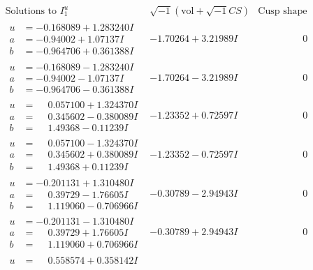 \documentclass[1p]{elsarticle_modified}
\theoremstyle{definition}
\newcommand{\I}{\sqrt{-1}}
\begin{document}
$$\begin{array}{c|c|c}
\text{Solutions to }I^u_{1}& \I (\text{vol} + \sqrt{-1}CS) & \text{Cusp shape}\\
 \hline 
\begin{aligned}
u &= -0.168089 + 1.283240 I \\
a &= -0.94002 + 1.07137 I \\
b &= -0.964706 + 0.361388 I\end{aligned}
 & -1.70264 + 3.21989 I & \phantom{-0.000000 } 0 \\ \hline\begin{aligned}
u &= -0.168089 - 1.283240 I \\
a &= -0.94002 - 1.07137 I \\
b &= -0.964706 - 0.361388 I\end{aligned}
 & -1.70264 - 3.21989 I & \phantom{-0.000000 } 0 \\ \hline\begin{aligned}
u &= \phantom{-}0.057100 + 1.324370 I \\
a &= \phantom{-}0.345602 - 0.380089 I \\
b &= \phantom{-}1.49368 - 0.11239 I\end{aligned}
 & -1.23352 + 0.72597 I & \phantom{-0.000000 } 0 \\ \hline\begin{aligned}
u &= \phantom{-}0.057100 - 1.324370 I \\
a &= \phantom{-}0.345602 + 0.380089 I \\
b &= \phantom{-}1.49368 + 0.11239 I\end{aligned}
 & -1.23352 - 0.72597 I & \phantom{-0.000000 } 0 \\ \hline\begin{aligned}
u &= -0.201131 + 1.310480 I \\
a &= \phantom{-}0.39729 - 1.76605 I \\
b &= \phantom{-}1.119060 - 0.706966 I\end{aligned}
 & -0.30789 - 2.94943 I & \phantom{-0.000000 } 0 \\ \hline\begin{aligned}
u &= -0.201131 - 1.310480 I \\
a &= \phantom{-}0.39729 + 1.76605 I \\
b &= \phantom{-}1.119060 + 0.706966 I\end{aligned}
 & -0.30789 + 2.94943 I & \phantom{-0.000000 } 0 \\ \hline\begin{aligned}
u &= \phantom{-}0.558574 + 0.358142 I \\

\end{aligned}
\end{array}$$
\end{document}
